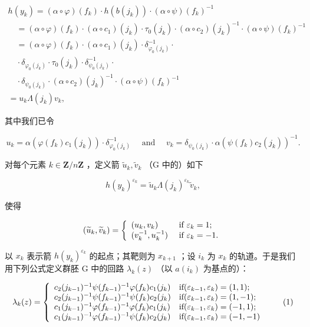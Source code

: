 \[
\begin{array}{l} h (y _ {k}) = (\alpha \circ \varphi) (f _ {k}) \cdot h (b (j _ {k})) \cdot (\alpha \circ \psi) (f _ {k}) ^ {- 1} \\ \quad = (\alpha \circ \varphi) (f _ {k}) \cdot (\alpha \circ c _ {1}) (j _ {k}) \cdot \tau_ {0} (j _ {k}) \cdot (\alpha \circ c _ {2}) (j _ {k}) ^ {- 1} \cdot (\alpha \circ \psi) (f _ {k}) ^ {- 1} \\ \quad = (\alpha \circ \varphi) (f _ {k}) \cdot (\alpha \circ c _ {1}) (j _ {k}) \cdot \delta_ {\varphi_ {0} (j _ {k})} ^ {- 1} \cdot \\ \quad \cdot \delta_ {\varphi_ {0} (j _ {k})} \cdot \tau_ {0} (j _ {k}) \cdot \delta_ {\psi_ {0} (j _ {k})} ^ {- 1} \cdot \\ \quad \cdot \delta_ {\psi_ {0} (j _ {k})} \cdot (\alpha \circ c _ {2}) (j _ {k}) ^ {- 1} \cdot (\alpha \circ \psi) (f _ {k}) ^ {- 1} \\ = u _ {k} \Lambda (j _ {k}) v _ {k}, \end{array}
\]

其中我们已令

\[
u _ {k} = \alpha (\varphi (f _ {k}) c _ {1} (j _ {k})) \cdot \delta_ {\varphi_ {0} (j _ {k})} ^ {- 1} \quad \text { and } \quad v _ {k} = \delta_ {\psi_ {0} (j _ {k})} \cdot \alpha (\psi (f _ {k}) c _ {2} (j _ {k})) ^ {- 1}.
\]

对每个元素 \(k \in \mathbf{Z}/n\mathbf{Z}\) ，定义箭 \(\widetilde{u}_{k}, \widetilde{v}_{k}\) （G 中的）如下

\[
h (y _ {k}) ^ {\varepsilon_ {k}} = \widetilde {u} _ {k} \Lambda (j _ {k}) ^ {\varepsilon_ {k}} \widetilde {v} _ {k},
\]

使得

\[
(\widetilde {u} _ {k}, \widetilde {v} _ {k}) = \left\{ \begin{array}{l l} (u _ {k}, v _ {k}) & \text { if } \varepsilon_ {k} = 1; \\ (v _ {k} ^ {- 1}, u _ {k} ^ {- 1}) & \text { if } \varepsilon_ {k} = - 1. \end{array} \right.
\]

以 \(x_{k}\) 表示箭 \(h(y_{k})^{\varepsilon_{k}}\) 的起点；其靶则为 \(x_{k+1}\) ；设 \(i_{k}\) 为 \(x_{k}\) 的轨道。于是我们用下列公式定义群胚 G 中的回路 \(\lambda_{k}(z)\) （以 \(a(i_{k})\) 为基点的）：

\[
\lambda_ {k} (z) = \left\{ \begin{array}{l l} c _ {2} (j _ {k - 1}) ^ {- 1} \psi (f _ {k - 1}) ^ {- 1} \varphi (f _ {k}) c _ {1} (j _ {k}) & \text {if} (\varepsilon_ {k - 1}, \varepsilon_ {k}) = (1, 1); \\ c _ {2} (j _ {k - 1}) ^ {- 1} \psi (f _ {k - 1}) ^ {- 1} \psi (f _ {k}) c _ {2} (j _ {k}) & \text {if} (\varepsilon_ {k - 1}, \varepsilon_ {k}) = (1, - 1); \\ c _ {1} (j _ {k - 1}) ^ {- 1} \varphi (f _ {k - 1}) ^ {- 1} \varphi (f _ {k}) c _ {1} (j _ {k}) & \text {if} (\varepsilon_ {k - 1}, \varepsilon_ {k}) = (- 1, 1); \\ c _ {1} (j _ {k - 1}) ^ {- 1} \varphi (f _ {k - 1}) ^ {- 1} \psi (f _ {k}) c _ {2} (j _ {k}) & \text {if} (\varepsilon_ {k - 1}, \varepsilon_ {k}) = (- 1, - 1) \end{array} \right.\tag{1}
\]

